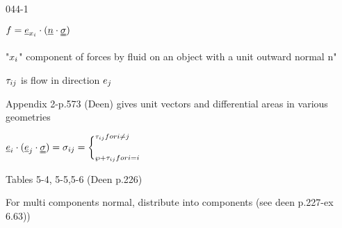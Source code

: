 \begin{mitframe}{044-1}
\begin{listone}
\item $\fug=\mcef_{\specfrac{i}}\cdot(\normvec\cdot\stresstens)$
        \begin{listtwo}
        	\item "$\specfrac{i}$" component of forces by fluid on an object with a unit outward normal n"
            \item $\shear$ is flow in direction $\e_j$
            \item Appendix 2-p.573 (Deen) gives unit vectors and differential areas in various geometries
            \item $\uv\cdot(\mcef_j\cdot\stresstens)=\molecrad_{\state{j}}=\bigg\{_{\dynpress +\shear for\state =i}^{\shear for \state\neq{j}} $
            \item Tables 5-4, 5-5,5-6 (Deen p.226)
            \item For multi components normal, distribute into components (see deen p.227-ex 6.63))
        \end{listtwo}

\end{listone}
\end{mitframe}